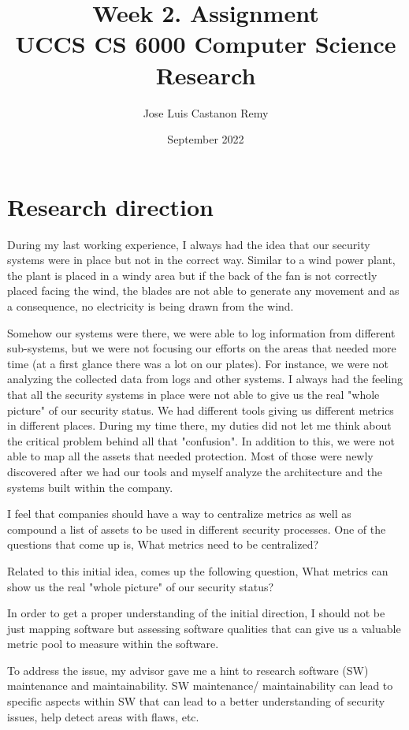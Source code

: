 \documentclass[article]{IEEEtran}
\title{Week 2. Assignment \\
\large UCCS CS 6000 Computer Science Research}
\author{Jose Luis Castanon Remy}
\date{September 2022}
\begin{document}
\maketitle




\section{Research direction}
During my last working experience, I always had the idea that our security systems were in place but not in the correct way. Similar to a wind power plant, the plant is placed in a windy area but if the back of the fan is not correctly placed facing the wind, the blades are not able to generate any movement and as a consequence, no electricity is being drawn from the wind.

Somehow our systems were there, we were able to log information from different sub-systems, but we were not focusing our efforts on the areas that needed more time (at a first glance there was a lot on our plates). For instance, we were not analyzing the collected data from logs and other systems. I always had the feeling that all the security systems in place were not able to give us the real "whole picture" of our security status. We had different tools giving us different metrics in different places. During my time there, my duties did not let me think about the critical problem behind all that "confusion". In addition to this, we were not able to map all the assets that needed protection. Most of those were newly discovered after we had our tools and myself analyze the architecture and the systems built within the company. 

I feel that companies should have a way to centralize metrics as well as compound a list of assets to be used in different security processes. One of the questions that come up is, What metrics need to be centralized? 

Related to this initial idea, comes up the following question, What metrics can show us the real "whole picture" of our security status? 

In order to get a proper understanding of the initial  direction, I should not be just mapping software but assessing software qualities that can give us a valuable metric pool to measure within the software. 

To address the issue, my advisor gave me a hint to research software (SW) maintenance and maintainability. SW maintenance/ maintainability can lead to specific aspects within SW that can lead to a better understanding of security issues, help detect areas with flaws, etc.
\end{document}
